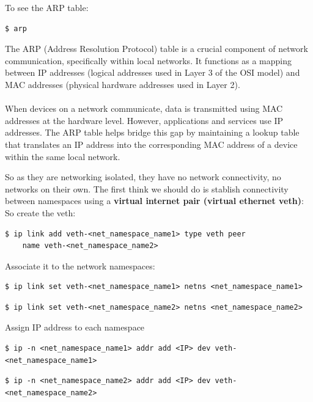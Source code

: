 \documentclass{article}
\newenvironment{blocktemplateII}[1]{%
    \tcolorbox[beamer,%
    noparskip,breakable,
    colframe=Green,%
    colbacklower=LimeGreen!75!LightGreen,%
    title=#1]}%
    {\endtcolorbox}
\newenvironment{codetemplate}[1][]{%
  \mybasecolorbox[#1]
  \itshape
}{%
  \endmybasecolorbox
}
\begin{document}
To see the ARP table:
\begin{codetemplate}{}
\begin{verbatim}
$ arp
\end{verbatim}
\end{codetemplate}

\begin{blocktemplateII}{NOTE}
The ARP (Address Resolution Protocol) table is a crucial component of network communication, specifically within local networks. It functions as a mapping between IP addresses (logical addresses used in Layer 3 of the OSI model) and MAC addresses (physical hardware addresses used in Layer 2).
\\\\
When devices on a network communicate, data is transmitted using MAC addresses at the hardware level. However, applications and services use IP addresses. The ARP table helps bridge this gap by maintaining a lookup table that translates an IP address into the corresponding MAC address of a device within the same local network.
\end{blocktemplateII}

So as they are networking isolated, they have no network connectivity, no networks on their own. The first think we should do is stablish connectivity between namespaces using a \textbf{virtual internet pair (virtual ethernet veth)}:
So create the veth:
\begin{codetemplate}{}
\begin{verbatim}
$ ip link add veth-<net_namespace_name1> type veth peer 
    name veth-<net_namespace_name2>
\end{verbatim}
\end{codetemplate}

Associate it to the network namespaces:
\begin{codetemplate}{}
\begin{verbatim}
$ ip link set veth-<net_namespace_name1> netns <net_namespace_name1>
\end{verbatim}
\end{codetemplate}
\begin{codetemplate}{}
\begin{verbatim}
$ ip link set veth-<net_namespace_name2> netns <net_namespace_name2>
\end{verbatim}
\end{codetemplate}

Assign IP address to each namespace
\begin{codetemplate}{}
\begin{verbatim}
$ ip -n <net_namespace_name1> addr add <IP> dev veth-<net_namespace_name1>
\end{verbatim}
\end{codetemplate}
\begin{codetemplate}{}
\begin{verbatim}
$ ip -n <net_namespace_name2> addr add <IP> dev veth-<net_namespace_name2>
\end{verbatim}
\end{codetemplate}
\end{document}
